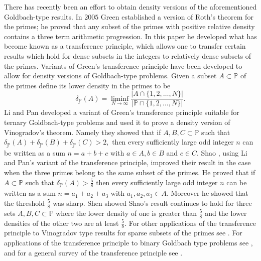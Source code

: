 \documentclass[a4paper,11pt,twoside]{amsart}
\theoremstyle{definition}
\numberwithin{equation}{section}
\begin{document}
There has recently been an effort to obtain density versions of the aforementioned Goldbach-type results. In $2005$ Green \cite{Green} established a version of Roth's theorem for the primes; he proved that any subset of the primes with positive relative density contains a three term arithmetic progression. In this paper he developed what has become known as a transference principle, which allows one to transfer certain results which hold for dense subsets in the integers to relatively dense subsets of the primes. Variants of Green's transference principle have been developed to allow for density versions of Goldbach-type problems. Given a subset $A \subset \mathbb{P}$ of the primes define its lower density in the primes to be $$\underline{\delta_{\mathbb{P}}}(A) = \liminf_{N \rightarrow \infty} \frac{|A\cap \{1,2,\dots,N\}|}{|\mathbb{P} \cap \{1,2,\dots,N\}|}.$$ Li and Pan \cite{LiPan} developed a variant of Green's transference principle suitable for ternary Goldbach-type problems and used it to prove a density version of Vinogradov's theorem. Namely they showed that if $A,B,C \subset \mathbb{P}$ such that $\underline{\delta_{\mathbb{P}}}(A) + \underline{\delta_{\mathbb{P}}}(B) + \underline{\delta_{\mathbb{P}}}(C) > 2,$ then every sufficiently large odd integer $n$ can be written as a sum $n = a + b + c$ with $a \in A,b \in B$ and $c \in C.$ Shao \cite{Shao}, using Li and Pan's variant of the transference principle, improved their result in the case when the three primes belong to the same subset of the primes. He proved that if $A \subset \mathbb{P}$ such that $\underline{\delta_{\mathbb{P}}}(A) > \frac{5}{8}$ then every sufficiently large odd integer $n$ can be written as a sum  $n = a_1 + a_2 + a_3$ with $a_1,a_2,a_3 \in A.$ Moreover he showed that the threshold $\frac{5}{8}$ was sharp. Shen \cite{Shen} showed Shao's result continues to hold for three sets $A,B,C \subset \mathbb{P}$ where the lower density of one is greater than $\frac{5}{8}$ and the lower densities of the other two are at least $\frac{5}{8}.$ For other applications of the transference principle to Vinogradov type results for sparse subsets of the primes see \cite{Shao-Kaisa-Joni,Shao-Kaisa, Grimmelt}. For applications of the transference principle to binary Goldbach type problems see \cite{ChipeniukHamel,Joni,Matomaki,Alsetri-Shao}, and for a general survey of the transference principle see \cite{Prendiville}.
\end{document}
